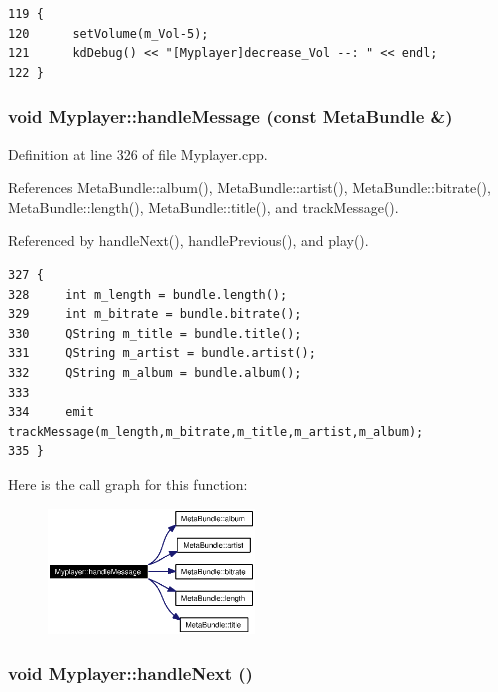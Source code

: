 \footnotesize\begin{verbatim}119 {
120      setVolume(m_Vol-5);
121      kdDebug() << "[Myplayer]decrease_Vol --: " << endl;
122 }
\end{verbatim}\normalsize 
{}
\subsubsection{\setlength{\rightskip}{0pt plus 5cm}void Myplayer::handle\-Message (const {\bf Meta\-Bundle} \&)}\label{classMyplayer_Myplayera2}




Definition at line 326 of file Myplayer.cpp.

References Meta\-Bundle::album(), Meta\-Bundle::artist(), Meta\-Bundle::bitrate(), Meta\-Bundle::length(), Meta\-Bundle::title(), and track\-Message().

Referenced by handle\-Next(), handle\-Previous(), and play().



\footnotesize\begin{verbatim}327 {
328     int m_length = bundle.length();
329     int m_bitrate = bundle.bitrate();
330     QString m_title = bundle.title();
331     QString m_artist = bundle.artist();
332     QString m_album = bundle.album();
333 
334     emit trackMessage(m_length,m_bitrate,m_title,m_artist,m_album);
335 }
\end{verbatim}\normalsize 


Here is the call graph for this function:\begin{figure}[H]
\begin{center}
\leavevmode
\includegraphics[width=155pt]{classMyplayer_Myplayera2_cgraph}
\end{center}
\end{figure}
\subsubsection{\setlength{\rightskip}{0pt plus 5cm}void Myplayer::handle\-Next ()\hspace{0.3cm}{\tt  [slot]}}\label{classMyplayer_Myplayeri9}




